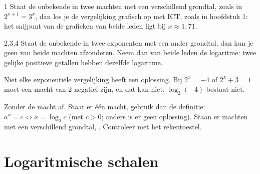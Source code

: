 \begin{alleenvoor}{1}
Staat de onbekende in twee machten met een verschillend grondtal, zoals in $2^{x + 1} = 3^x$, dan los je de vergelijking grafisch op met ICT, zoals in hoofdstuk 1: het snijpunt van de grafieken van beide leden ligt bij $x \approx 1{,}71$.
\end{alleenvoor}
\begin{alleenvoor}{2,3,4}
Staat de onbekende in twee exponenten met een ander grondtal, dan kun je geen van beide machten afzonderen. Neem dan van beide leden de logaritme: twee gelijke positieve getallen hebben dezelfde logaritme.

\end{alleenvoor}

Niet elke exponentiële vergelijking heeft een oplossing. Bij $2^x = -4$ of $2^x + 3 = 1$ moet een macht van 2 negatief zijn, en dat kan niet: $\log_2(-4)$ bestaat niet.

\begin{werkwijze}
Zonder de macht af. Staat er één macht, gebruik dan de definitie: $a^x = c \iff x = \log_a c$ (met $c > 0$; anders is er geen oplossing). Staan er machten met een verschillend grondtal, . Controleer met het rekentoestel.
\end{werkwijze}

\begin{oefeningen}
\end{oefeningen}

\section{Logaritmische schalen}


